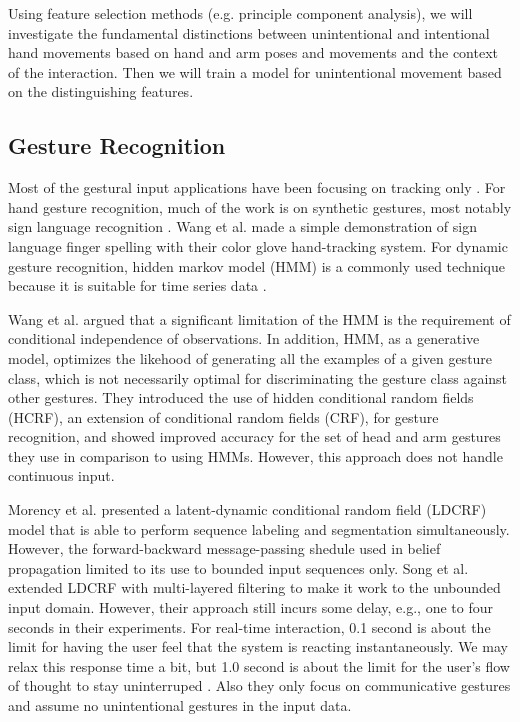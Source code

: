 Using feature selection methods (e.g. principle component analysis), we will
investigate the fundamental distinctions between unintentional and intentional
hand movements based on hand and arm poses and movements and the context of the
interaction. Then we will train a model for unintentional movement based on the
distinguishing features.

\subsection{Gesture Recognition}
Most of the gestural input applications have been focusing on tracking only
\cite{harrison11} \cite{larson11}. For hand gesture recognition, much of the
work is on synthetic gestures, most notably sign language recognition
\cite{Bauer00} \cite{kadous02}. Wang et al. \cite{Wang09} made a simple
demonstration of sign language finger spelling with their color glove
hand-tracking system. For dynamic gesture recognition, hidden markov model (HMM) is a commonly used
technique because it is suitable for time series data \cite{sharma00}. 

Wang et al. \cite{wang06} argued that a significant limitation of the
HMM is the requirement of conditional independence of observations. In
addition, HMM, as a generative model, optimizes the likehood of
generating all the examples of a given gesture class, which is not
necessarily optimal for discriminating the gesture class against other
gestures. They introduced the use of hidden conditional random fields (HCRF),
an extension of conditional random fields (CRF), for gesture recognition, and
showed improved accuracy for the set of head and arm gestures they use in comparison to using HMMs. 
However, this approach does not handle continuous input. 

Morency et al. \cite{morency07} presented a latent-dynamic conditional
random field (LDCRF) model that is able to perform sequence labeling and
segmentation simultaneously. However, the forward-backward message-passing
shedule used in belief propagation limited to its use to bounded input
sequences only. Song et al. \cite{song12} extended LDCRF with multi-layered
filtering to make it work to the unbounded input domain. However, their approach
still incurs some delay, e.g., one to four seconds in their experiments. For
real-time interaction, 0.1 second is about the limit for having the user feel
that the system is reacting instantaneously. We may relax this response time a
bit, but 1.0 second is about the limit for the user's flow of thought to stay
uninterruped \cite{card91}.  Also they only focus on communicative
gestures and assume no unintentional gestures in the input data.

